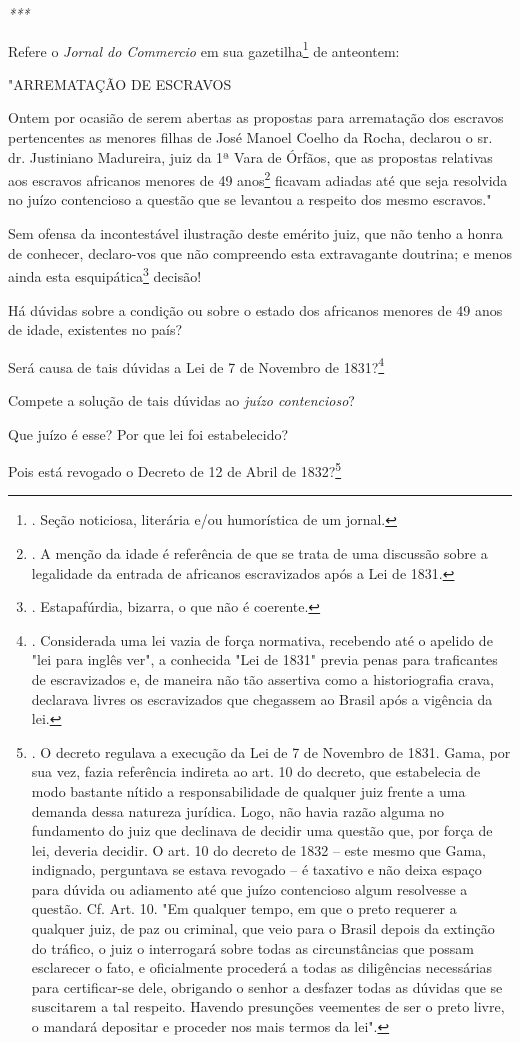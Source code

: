 \emph{***}

Refere o \emph{Jornal do Commercio} em sua gazetilha\footnote{. Seção
  noticiosa, literária e/ou humorística de um jornal.} de anteontem:

"ARREMATAÇÃO DE ESCRAVOS

Ontem por ocasião de serem abertas as propostas para arrematação dos
escravos pertencentes as menores filhas de José Manoel Coelho da Rocha,
declarou o sr. dr. Justiniano Madureira, juiz da 1ª Vara de Órfãos, que
as propostas relativas aos escravos africanos menores de 49
anos\footnote{. A menção da idade é referência de que se trata de uma
  discussão sobre a legalidade da entrada de africanos escravizados após
  a Lei de 1831.} ficavam adiadas até que seja resolvida no juízo
contencioso a questão que se levantou a respeito dos mesmo escravos."

Sem ofensa da incontestável ilustração deste emérito juiz, que não tenho
a honra de conhecer, declaro-vos que não compreendo esta extravagante
doutrina; e menos ainda esta esquipática\footnote{. Estapafúrdia,
  bizarra, o que não é coerente.} decisão!

Há dúvidas sobre a condição ou sobre o estado dos africanos menores de
49 anos de idade, existentes no país?

Será causa de tais dúvidas a Lei de 7 de Novembro de 1831?\footnote{.
  Considerada uma lei vazia de força normativa, recebendo até o apelido
  de "lei para inglês ver", a conhecida "Lei de 1831" previa penas para
  traficantes de escravizados e, de maneira não tão assertiva como a
  historiografia crava, declarava livres os escravizados que chegassem
  ao Brasil após a vigência da lei.}

Compete a solução de tais dúvidas ao \emph{juízo contencioso}?

Que juízo é esse? Por que lei foi estabelecido?

Pois está revogado o Decreto de 12 de Abril de 1832?\footnote{. O
  decreto regulava a execução da Lei de 7 de Novembro de 1831. Gama, por
  sua vez, fazia referência indireta ao art. 10 do decreto, que
  estabelecia de modo bastante nítido a responsabilidade de qualquer
  juiz frente a uma demanda dessa natureza jurídica. Logo, não havia
  razão alguma no fundamento do juiz que declinava de decidir uma
  questão que, por força de lei, deveria decidir. O art. 10 do decreto
  de 1832 -- este mesmo que Gama, indignado, perguntava se estava
  revogado -- é taxativo e não deixa espaço para dúvida ou adiamento até
  que juízo contencioso algum resolvesse a questão. Cf. Art. 10. "Em
  qualquer tempo, em que o preto requerer a qualquer juiz, de paz ou
  criminal, que veio para o Brasil depois da extinção do tráfico, o juiz
  o interrogará sobre todas as circunstâncias que possam esclarecer o
  fato, e oficialmente procederá a todas as diligências necessárias para
  certificar-se dele, obrigando o senhor a desfazer todas as dúvidas que
  se suscitarem a tal respeito. Havendo presunções veementes de ser o
  preto livre, o mandará depositar e proceder nos mais termos da lei".}

